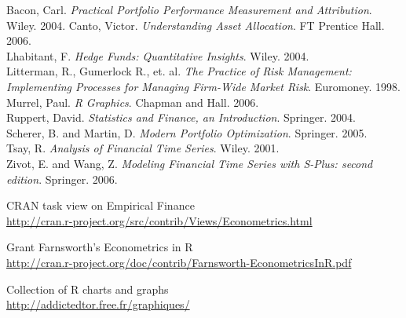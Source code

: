 \documentclass[12pt,letterpaper,english]{article}
\begin{document}
\begin{References}\relax
Bacon, Carl. \emph{Practical Portfolio Performance Measurement and Attribution}. Wiley. 2004.
Canto, Victor. \emph{Understanding Asset Allocation}. FT Prentice Hall. 2006. \\
Lhabitant, F. \emph{Hedge Funds: Quantitative Insights}. Wiley. 2004. \\
Litterman, R., Gumerlock R., et. al. \emph{The Practice of Risk Management: Implementing Processes for Managing Firm-Wide Market Risk}. Euromoney. 1998. \\
Murrel, Paul. \emph{R Graphics}. Chapman and Hall. 2006.  \\
Ruppert, David. \emph{Statistics and Finance, an Introduction}. Springer. 2004. \\
Scherer, B. and Martin, D. \emph{Modern Portfolio Optimization}. Springer. 2005. \\
Tsay, R. \emph{Analysis of Financial Time Series}. Wiley. 2001. \\
Zivot, E. and Wang, Z. \emph{Modeling Financial Time Series with S-Plus: second edition}. Springer. 2006. \\
\end{References}

CRAN task view on Empirical Finance \\ \url{http://cran.r-project.org/src/contrib/Views/Econometrics.html}

Grant Farnsworth's Econometrics in R \\ \url{http://cran.r-project.org/doc/contrib/Farnsworth-EconometricsInR.pdf}

Collection of R charts and graphs \\ \url{http://addictedtor.free.fr/graphiques/}
\end{document}
